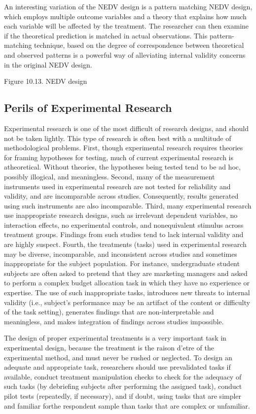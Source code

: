 An interesting variation of the NEDV design is a pattern matching NEDV design, which employs multiple outcome variables and a theory that explains how much each variable will be affected by the treatment. The researcher can then examine if the theoretical prediction is matched in actual observations. This pattern-matching technique, based on the degree of correspondence between theoretical and observed patterns is a powerful way of alleviating internal validity concerns in the original NEDV design.

Figure 10.13. NEDV design

\subsection{Perils of Experimental Research}

Experimental research is one of the most difficult of research designs, and should not be taken lightly. This type of research is often best with a multitude of methodological problems. First, though experimental research requires theories for framing hypotheses for testing, much of current experimental research is atheoretical. Without theories, the hypotheses being tested tend to be ad hoc, possibly illogical, and meaningless. Second, many of the measurement instruments used in experimental research are not tested for reliability and validity, and are incomparable across studies. Consequently, results generated using such instruments are also incomparable. Third, many experimental research use inappropriate research designs, such as irrelevant dependent variables, no interaction effects, no experimental controls, and nonequivalent stimulus across treatment groups. Findings from such studies tend to lack internal validity and are highly suspect. Fourth, the treatments (tasks) used in experimental research may be diverse, incomparable, and inconsistent across studies and sometimes inappropriate for the subject population. For instance, undergraduate student subjects are often asked to pretend that they are marketing managers and asked to perform a complex budget allocation task in which they have no experience or expertise. The use of such inappropriate tasks,  introduces new threats to internal validity (i.e., subject’s performance may be an artifact of the content or difficulty of the task setting), generates findings that are non-interpretable and meaningless, and makes integration of findings across studies impossible.

The design of proper experimental treatments is a very important task in experimental design, because the treatment is the raison d’etre of the experimental method, and must never be rushed or neglected. To design an adequate and appropriate task, researchers should use prevalidated tasks if available, conduct treatment manipulation checks to check for the adequacy of such tasks (by debriefing subjects after performing the assigned task), conduct pilot tests (repeatedly, if necessary), and if doubt, using tasks that are simpler and familiar forthe respondent sample than tasks that are complex or unfamiliar.

